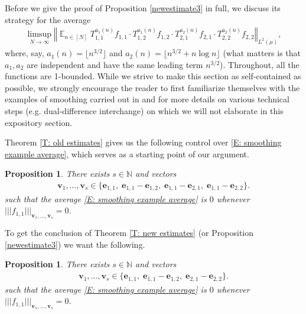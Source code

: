 \documentclass[11pt]{amsart}
\newtheorem{proposition}[lemma]{Proposition}
\theoremstyle{definition}
\DeclareMathOperator*{\E}{\mathbb{E}}
\newcommand{\N}{{\mathbb N}}
\newcommand{\be}{{\mathbf{e}}}
\newcommand{\bv}{{\mathbf{v}}}
\newcommand{\norm}[1]{\left\Vert #1\right\Vert}
\newcommand{\nnorm}[1]{\lvert\!|\!| #1|\!|\!\rvert}
\newcommand{\1}{{\mathbf{1}}}
\newcommand{\sfloor}[1]{{\lfloor #1 \rfloor}}
\begin{document}
Before we give the proof of Proposition \ref{newestimate3} in full, we discuss its strategy for the average
\begin{align}\label{E: smoothing example average}
    \limsup_{N\to\infty}\norm{\E_{n\in [N]} T_{1,1}^{a_{1}(n)} f_{1,1}\cdot T_{1,2}^{a_{1}(n)} f_{1,2}\cdot T_{2,1}^{a_{2}(n)} f_{2,1}\cdot T_{2,2}^{a_{2}(n)} f_{2,2}}_{L^2(\mu)},
\end{align}
where, say, $a_1(n) = \sfloor{n^{3/2}}$ and $a_2(n) = \sfloor{n^{3/2}+n\log n}$ (what matters is that $a_1, a_2$ are independent and have the same leading term $n^{3/2}$). Throughout, all the functions are 1-bounded. While we strive to make this section as self-contained as possible, we strongly encourage the reader to first familiarize themselves with the examples of smoothing carried out in \cite[Section 8.1]{FrKu22a} and \cite[Section 4]{FrKu22b} for more details on various technical steps (e.g. dual-difference interchange) on which we will not elaborate in this expository section.


Theorem \ref{T: old estimates} gives us the following control over \eqref{E: smoothing example average}, which serves as a starting point of our argument.
\begin{proposition}\label{P: old estimates example}
    There exists $s\in\N$ and vectors
    \begin{align}\label{E: old vectors example}
        \bv_1, \ldots, \bv_s\in \{\be_{1,1},\; \be_{1,1}-\be_{1,2},\; \be_{1,1}-\be_{2,1},\; \be_{1,1}-\be_{2,2}\}.
    \end{align}
    such that the average \eqref{E: smoothing example average} is $0$ whenever $\nnorm{f_{1,1}}_{\bv_1, \ldots, \bv_s}=0$.
\end{proposition}
To get the conclusion of Theorem \ref{T: new estimates} (or Proposition \ref{newestimate3}) we want the following.
\begin{proposition}\label{P: new estimates example}
    There exists $s\in\N$ and vectors 
    \begin{align}\label{E: new vectors example}
    \bv_1, \ldots, \bv_s\in\{\be_{1,1},\; \be_{1,1}-\be_{1,2},\; \be_{2,1}-\be_{2,2}\}.
\end{align}
    such that the average \eqref{E: smoothing example average} is $0$ whenever $\nnorm{f_{1,1}}_{\bv_1, \ldots, \bv_s}=0$.
\end{proposition}
    
\end{document}

